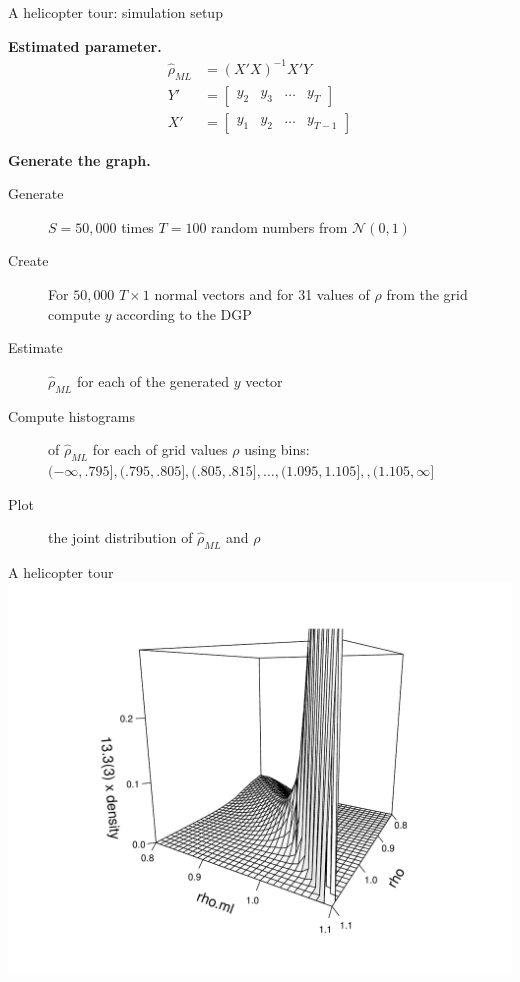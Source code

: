 \documentclass[notes,blackandwhite,mathsans]{beamer}
\begin{document}
\begin{frame}{A helicopter tour: simulation setup}

\textbf{Estimated parameter.} \small
 \begin{align*}
\hat\rho_{ML} &= (X'X)^{-1}X'Y\\
Y' &= \begin{bmatrix} y_2 & y_3 & \dots& y_T \end{bmatrix}\\
X' &= \begin{bmatrix} y_1 & y_2 & \dots& y_{T-1} \end{bmatrix}
\end{align*}

\smallskip\normalsize\textbf{Generate the graph.}\small
\begin{description}
\item[Generate] $S=50,000$ {\color{mcxs2}times} $T=100$ {\color{mcxs2}random numbers from} $\mathcal{N}(0,1)$
\item[Create] {\color{mcxs2}For} $50,000$ $T\times1$ {\color{mcxs2}normal vectors and for 31 values of} $\rho$ {\color{mcxs2}from the grid compute} $y$ {\color{mcxs2}according to the} {\color{mcxs3}DGP}
\item[Estimate] $\hat\rho_{ML}$ {\color{mcxs2}for each of the generated} $y$ {\color{mcxs2}vector} 
\item[Compute histograms] {\color{mcxs2}of} $\hat\rho_{ML}$ {\color{mcxs2}for each of grid values} $\rho$ {\color{mcxs2}using bins:}
$ (-\infty,.795], (.795, .805], (.805, .815], \dots , (1.095, 1.105], , (1.105, \infty] $
\item[Plot] {\color{mcxs2}the joint distribution of} $\hat\rho_{ML}$ {\color{mcxs2}and} $\rho$
\end{description}

\end{frame}


{
\begin{frame}{A helicopter tour}
\centering
\includegraphics[scale=0.45]{grphs/05behind-nopdf}

\end{frame}
}
\end{document}
